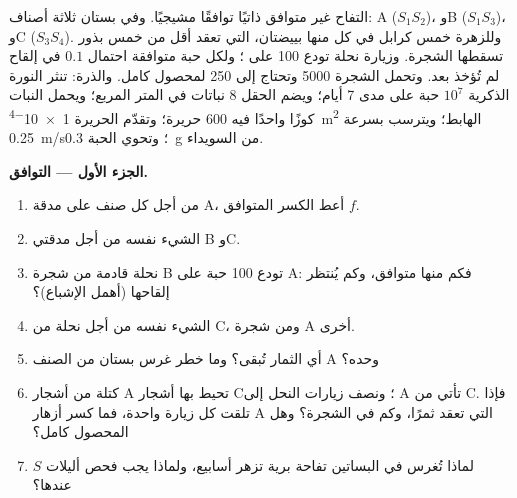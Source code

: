 \begin{problem}
\label{pb:b2:angiosperm-reproduction:1}
التفاح غير متوافق ذاتيًا توافقًا مشيجيًا. وفي بستان ثلاثة
أصناف: A ($S_1S_2$)، وB ($S_1S_3$)، وC ($S_3S_4$). وللزهرة خمس
كرابل في كل منها بييضتان،  التي تعقد أقل من خمس بذور تسقطها
الشجرة. وزيارة نحلة تودع \num{100} 
على ؛ ولكل حبة متوافقة احتمال $0.1$ في
إلقاح  لم تُؤخذ بعد. وتحمل الشجرة \num{5000} 
وتحتاج إلى \num{250}  لمحصول كامل. والذرة: تنثر النورة الذكرية
$10^{7}$ حبة على مدى \num{7} أيام؛ ويضم الحقل \num{8} نباتات في
المتر المربع؛ ويحمل النبات كوزًا واحدًا فيه \num{600} حريرة؛
وتقدّم الحريرة \qty{1e-4}{m^2}  الهابط؛ ويترسب  بسرعة
\qty{0.25}{m/s}؛ وتحوي الحبة \qty{0.3}{g} من السويداء.

\medskip
\noindent\textbf{الجزء الأول --- التوافق.}
\begin{enumerate}
  \item من أجل  كل صنف على مدقة A، أعط الكسر المتوافق $f$.
  \item الشيء نفسه من أجل مدقتي B وC.
  \item نحلة قادمة من شجرة B تودع 100 حبة على  A: فكم منها
        متوافق، وكم  يُنتظر إلقاحها (أهمل الإشباع)؟
  \item الشيء نفسه من أجل نحلة من C، ومن شجرة A أخرى.
  \item أي الثمار تُبقى؟ وما خطر غرس بستان من الصنف A وحده؟
  \item كتلة من أشجار A تحيط بها أشجار C؛ ونصف زيارات النحل إلى A
        تأتي من C. فإذا تلقت كل  زيارة واحدة، فما كسر أزهار A
        التي تعقد ثمرًا، وكم  في الشجرة؟ وهل المحصول كامل؟
  \item لماذا تُغرس في البساتين تفاحة برية تزهر أسابيع، ولماذا يجب
        فحص أليلات $S$ عندها؟
\end{enumerate}


\end{problem}
